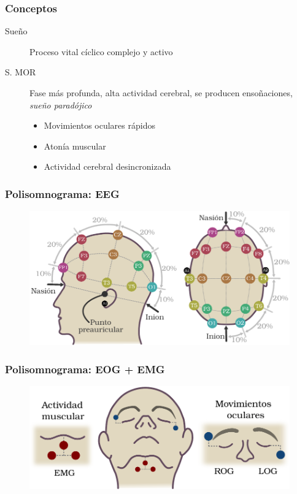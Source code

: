 \documentclass[serif,mathserif,professionalfont]{beamer}
\begin{document}

\begin{frame}
\frametitle{Conceptos}
\begin{description}
\item[Sue\~no] Proceso vital c\'iclico complejo y activo
\item[S. MOR] Fase m\'as profunda, alta actividad cerebral, se producen enso\~naciones, 
\textit{sue\~no parad\'ojico}
\begin{itemize}
\item Movimientos oculares r\'apidos
\item Aton\'ia muscular
\item Actividad cerebral desincronizada
\end{itemize}
\end{description}
\end{frame}


\begin{frame}\frametitle{Polisomnograma: EEG}
\begin{figure}
\centering
\includegraphics[width=0.9\linewidth]{./img_diagramas/cabeza_proporcionada_color_v2.pdf} 
\end{figure}
\end{frame}

\begin{frame}\frametitle{Polisomnograma: EOG + EMG}
\begin{figure}
\centering
\includegraphics[width=0.9\linewidth]{./img_diagramas/emg_eog_v3.pdf} 
\end{figure}
\end{frame}
\end{document}
